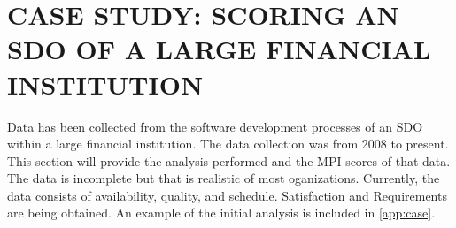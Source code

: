 \documentclass[SDSUThesis.tex]{subfiles}
\begin{document}
\section{CASE STUDY: SCORING AN SDO OF A LARGE FINANCIAL INSTITUTION}

Data has been collected from the software development processes of
an SDO within a large financial institution.
The data collection was from 2008 to present. This section will provide the analysis performed and the MPI scores of that data. The data is incomplete but that is realistic of most oganizations.  Currently, the data
consists of availability, quality, and schedule.  Satisfaction and Requirements are being obtained. An example of the initial analysis is included in \cref{app:case}.





\end{document}
